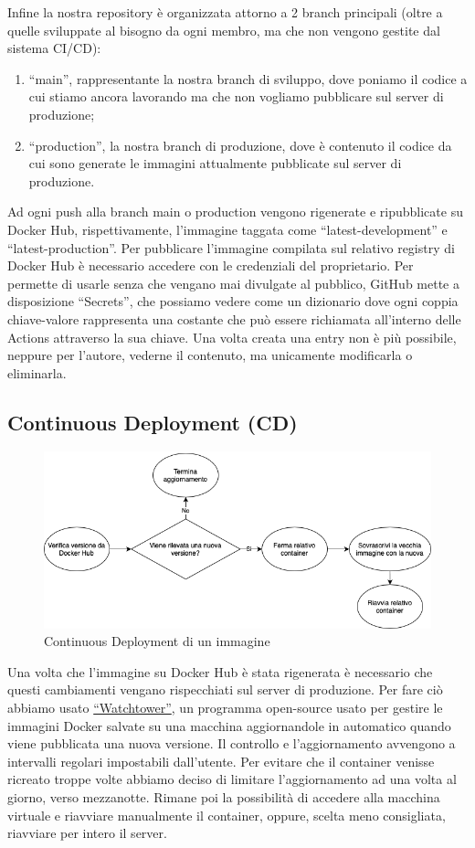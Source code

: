 Infine la nostra repository è organizzata attorno a 2 branch principali (oltre a quelle sviluppate al bisogno da ogni membro, ma che non vengono gestite dal sistema CI/CD):
\begin{enumerate}
  \item ``main'', rappresentante la nostra branch di sviluppo, dove poniamo il codice a cui stiamo ancora lavorando ma che non vogliamo pubblicare sul server di produzione;
  \item  ``production'', la nostra branch di produzione, dove è contenuto il codice da cui sono generate le immagini attualmente pubblicate sul server di produzione.
\end{enumerate}
Ad ogni push alla branch main o production vengono rigenerate e ripubblicate su Docker Hub, rispettivamente, l'immagine taggata come ``latest-development'' e \\ ``latest-production''.
Per pubblicare l'immagine compilata sul relativo registry di Docker Hub è necessario accedere con le credenziali del proprietario. Per permette di usarle senza che vengano mai divulgate al pubblico, GitHub mette a disposizione ``Secrets'', che possiamo vedere come un dizionario dove ogni coppia chiave-valore rappresenta una costante che può essere richiamata all'interno delle Actions attraverso la sua chiave. Una volta creata una entry non è più possibile, neppure per l'autore, vederne il contenuto, ma unicamente modificarla o eliminarla.
\newpage
\subsection{Continuous Deployment (CD)}
\label{sect:CD_it3}
\begin{figure}[h!]
  \centering
  \includegraphics[width=1\textwidth]{Iterazione 3/images/CD.png}
  \caption{Continuous Deployment di un immagine}
\end{figure}
Una volta che l'immagine su Docker Hub è stata rigenerata è necessario che questi cambiamenti vengano rispecchiati sul server di produzione. Per fare ciò abbiamo usato  \href{https://containrrr.dev/watchtower/}{``Watchtower''}, un programma open-source usato per gestire le immagini Docker salvate su una macchina aggiornandole in automatico quando viene pubblicata una nuova versione. Il controllo e l'aggiornamento avvengono a intervalli regolari impostabili dall'utente. Per evitare che il container venisse ricreato troppe volte abbiamo deciso di limitare l'aggiornamento ad una volta al giorno, verso mezzanotte. Rimane poi la possibilità di accedere alla macchina virtuale e riavviare manualmente il container, oppure, scelta meno consigliata, riavviare per intero il server.
